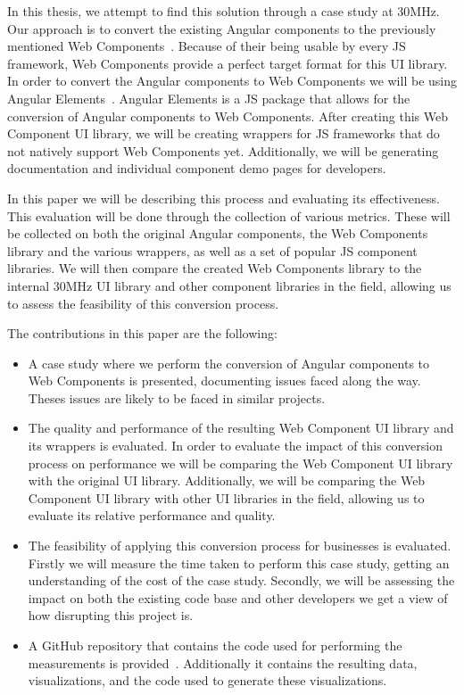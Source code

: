 In this thesis, we attempt to find this solution through a case study at 30MHz. Our approach is to convert the existing Angular components to the previously mentioned Web Components~. Because of their being usable by every JS framework, Web Components provide a perfect target format for this UI library. In order to convert the Angular components to Web Components we will be using Angular Elements~. Angular Elements is a JS package that allows for the conversion of Angular components to Web Components. After creating this Web Component UI library, we will be creating wrappers for JS frameworks that do not natively support Web Components yet. Additionally, we will be generating documentation and individual component demo pages for developers.

In this paper we will be describing this process and evaluating its effectiveness. This evaluation will be done through the collection of various metrics. These will be collected on both the original Angular components, the Web Components library and the various wrappers, as well as a set of popular JS component libraries. We will then compare the created Web Components library to the internal 30MHz UI library and other component libraries in the field, allowing us to assess the feasibility of this conversion process.

The contributions in this paper are the following:

\begin{itemize}
	\item A case study where we perform the conversion of Angular components to Web Components is presented, documenting issues faced along the way. Theses issues are likely to be faced in similar projects.
	\item The quality and performance of the resulting Web Component UI library and its wrappers is evaluated. In order to evaluate the impact of this conversion process on performance we will be comparing the Web Component UI library with the original UI library. Additionally, we will be comparing the Web Component UI library with other UI libraries in the field, allowing us to evaluate its relative performance and quality.
	\item The feasibility of applying this conversion process for businesses is evaluated. Firstly we will measure the time taken to perform this case study, getting an understanding of the cost of the case study. Secondly, we will be assessing the impact on both the existing code base and other developers we get a view of how disrupting this project is.
	\item A GitHub repository that contains the code used for performing the measurements is provided~. Additionally it contains the resulting data, visualizations, and the code used to generate these visualizations.
\end{itemize}